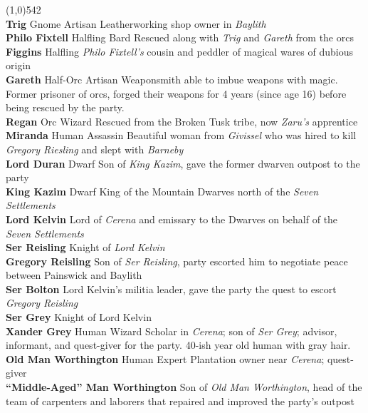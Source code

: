 \documentclass[letterpaper]{article}
\newcommand{\fullline}{\noindent\line(1,0){542} \\}
\newcommand{\person}[3]{\noindent\textbf{#1
    \ifstrequal{#2}{M}{{\color{ProcessBlue}\male}}{%
    \ifstrequal{#2}{F}{\color{VioletRed}\female}{}}}{\scriptsize #3}}
\begin{document}
 \par
\vspace{-0.75em}
\fullline
\person{Trig}{F}{Gnome Artisan} Leatherworking shop owner in \emph{Baylith} \\
\person{Philo Fixtell}{M}{Halfling Bard} Rescued along with \emph{Trig} and \emph{Gareth} from the orcs \\
\person{Figgins}{M}{Halfling} \emph{Philo Fixtell's} cousin and peddler of magical wares of dubious origin \\
\person{Gareth}{M}{Half-Orc Artisan} Weaponsmith able to imbue weapons with magic. Former prisoner of orcs, forged their weapons for 4 years (since age 16) before being rescued by the party. \\
\person{Regan}{M}{Orc Wizard} Rescued from the Broken Tusk tribe, now \emph{Zaru's} apprentice \\
\person{Miranda}{F}{Human Assassin} Beautiful woman from \emph{Givissel} who was hired to kill \emph{Gregory Riesling} and slept with \emph{Barneby} \\
\person{Lord Duran}{M}{Dwarf} Son of \emph{King Kazim}, gave the former dwarven outpost to the party \\
\person{King Kazim}{M}{Dwarf} King of the Mountain Dwarves north of the \emph{Seven Settlements} \\
\person{Lord Kelvin}{M}{} Lord of \emph{Cerena} and emissary to the Dwarves on behalf of the \emph{Seven Settlements} \\
\person{Ser Reisling}{M}{} Knight of \emph{Lord Kelvin} \\
\person{Gregory Reisling}{M}{} Son of \emph{Ser Reisling}, party escorted him to negotiate peace between Painswick and Baylith \\
\person{Ser Bolton}{M}{} Lord Kelvin's militia leader, gave the party the quest to escort \emph{Gregory Reisling} \\
\person{Ser Grey}{M}{} Knight of Lord Kelvin \\
\person{Xander Grey}{M}{Human Wizard} Scholar in \emph{Cerena}; son of \emph{Ser Grey}; advisor, informant, and quest-giver for the party.  40-ish year old human with gray hair.\\
\person{Old Man Worthington}{M}{Human Expert} Plantation owner near \emph{Cerena}; quest-giver \\
\person{``Middle-Aged'' Man Worthington}{M}{} Son of \emph{Old Man Worthington}, head of the team of carpenters and laborers that repaired and improved the party's outpost \\
\end{document}
